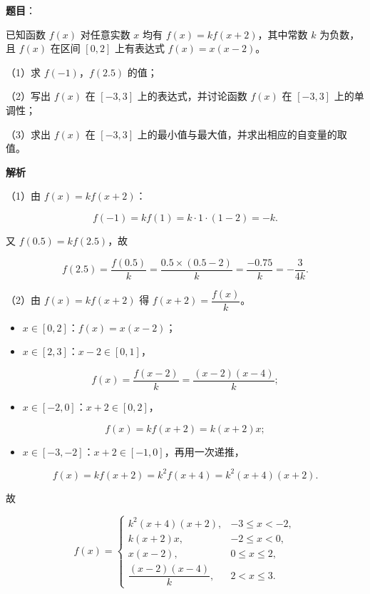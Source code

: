 \begin{answer}

\textbf{题目}：

已知函数 $f(x)$ 对任意实数 $x$ 均有 $f(x)=kf(x+2)$，其中常数 $k$ 为负数，且 $f(x)$ 在区间 $[0,2]$ 上有表达式 $f(x)=x(x-2)$。

（1）求 $f(-1)$，$f(2.5)$ 的值；

（2）写出 $f(x)$ 在 $[-3,3]$ 上的表达式，并讨论函数 $f(x)$ 在 $[-3,3]$ 上的单调性；

（3）求出 $f(x)$ 在 $[-3,3]$ 上的最小值与最大值，并求出相应的自变量的取值。

\textbf{解析}

（1）由 $f(x)=kf(x+2)$：

\nopagebreak[4]
\[f(-1)=kf(1)=k\cdot1\cdot(1-2)=-k.\]

又 $f(0.5)=kf(2.5)$，故

\nopagebreak[4]
\[f(2.5)=\frac{f(0.5)}k
=\frac{0.5\times(0.5-2)}k
=\frac{-0.75}k=-\frac3{4k}.\]

（2）由 $f(x)=kf(x+2)$ 得 $f(x+2)=\dfrac{f(x)}k$。

\begin{itemize}
\item $x\in[0,2]$：$f(x)=x(x-2)$；
\item $x\in[2,3]$：$x-2\in[0,1]$，
\end{itemize}

\nopagebreak[4]
\[f(x)=\frac{f(x-2)}k=\frac{(x-2)(x-4)}k;\]

\begin{itemize}
\item $x\in[-2,0]$：$x+2\in[0,2]$，
\end{itemize}

\nopagebreak[4]
\[f(x)=kf(x+2)=k(x+2)x;\]

\begin{itemize}
\item $x\in[-3,-2]$：$x+2\in[-1,0]$，再用一次递推，
\end{itemize}

\nopagebreak[4]
\[f(x)=kf(x+2)=k^2f(x+4)=k^2(x+4)(x+2).\]

故

\nopagebreak[4]
\[f(x)=\begin{cases}
k^2(x+4)(x+2),&-3\leqslant x<-2,\\
k(x+2)x,&-2\leqslant x<0,\\
x(x-2),&0\leqslant x\leqslant2,\\
\dfrac{(x-2)(x-4)}k,&2<x\leqslant3.
\end{cases}\]


\end{answer}
